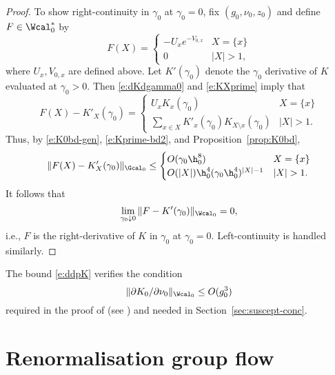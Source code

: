 \begin{proof}
To show right-continuity in $\gamma_0$ at $\gamma_0 = 0$,
fix $(g_0, \nu_0, z_0)$ and define $F \in \Wcal^*_0$ by
\begin{equation}
F(X) =
\begin{cases}
  -U_x e^{-V_{0,x}}
    & X = \{ x \} \\
  0 & |X| > 1,
\end{cases}
\end{equation}
where $U_x, V_{0,x}$ are defined above.
Let $K'(\gamma_0)$ denote the $\gamma_0$ derivative of $K$ evaluated at $\gamma_0 > 0$.  Then
\eqref{e:dKdgamma0} and \eqref{e:KXprime} imply that
\begin{equation}
F(X) - K'_X(\gamma_0)
  =
\begin{cases}
  U_x K_x(\gamma_0)
    & X = \{ x \} \\
  \sum_{x \in X} K'_x(\gamma_0) K_{X \setminus x}(\gamma_0)
    & |X| > 1.
\end{cases}
\end{equation}
Thus, by \eqref{e:K0bd-gen}, \eqref{e:Kprime-bd2}, and Proposition~\ref{prop:K0bd},
\begin{equation}
\|F(X) - K'_X(\gamma_0)\|_{\Gcal_0}
  \le
\begin{cases}
  O(\gamma_0 \h_0^8)
    & X = \{ x \} \\
  O(|X|) \h_0^4 (\gamma_0 \h_0^4)^{|X|-1}
    & |X| > 1.
\end{cases}
\end{equation}
It follows that
\begin{equation}
\lim_{\gamma_0\downarrow 0} \|F - K'(\gamma_0)\|_{\Wcal_0} = 0,
\end{equation}
i.e., $F$ is the right-derivative of $K$ in $\gamma_0$ at $\gamma_0 = 0$.
Left-continuity is handled similarly.
\end{proof}

\begin{rk}
\label{rk:DK-base-case}
The bound \eqref{e:ddpK} verifies the condition
\begin{equation}
\|\partial K_0/\partial\nu_0\|_{\Wcal_0} \le O(g_0^3)
\end{equation}
required in the proof of \cite[Lemma~\ref{log-lem:gzmuprime}]{BBS-saw4-log}
(see \cite[\eqref{log-e:induct1}]{BBS-saw4-log}) and needed in Section~\ref{sec:suscept-conc}.
\end{rk}

\section{Renormalisation group flow}
\label{sec:flow}

